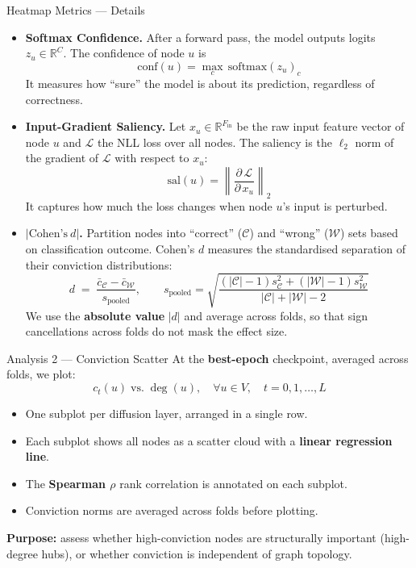 \documentclass[11pt]{beamer}
\begin{document}
\begin{frame}{Heatmap Metrics --- Details}
\begin{itemize}
    \setlength\itemsep{0.9em}

    \item \textbf{Softmax Confidence.}
    After a forward pass, the model outputs logits $z_u \in \mathbb{R}^C$. The confidence of node $u$ is
    \[
        \mathrm{conf}(u) = \max_{c}\, \mathrm{softmax}(z_u)_c
    \]
    It measures how ``sure'' the model is about its prediction, regardless of correctness.

    \item \textbf{Input-Gradient Saliency.}
    Let $x_u \in \mathbb{R}^{F_{\mathrm{in}}}$ be the raw input feature vector of node $u$ and $\mathcal{L}$ the NLL loss over all nodes. The saliency is the $\ell_2$ norm of the gradient of $\mathcal{L}$ with respect to $x_u$:
    \[
        \mathrm{sal}(u) = \left\|\frac{\partial\, \mathcal{L}}{\partial\, x_u}\right\|_2
    \]
    It captures how much the loss changes when node $u$'s input is perturbed.

    \item \textbf{$|\text{Cohen's}\ d|$.}
    Partition nodes into ``correct'' ($\mathcal{C}$) and ``wrong'' ($\mathcal{W}$) sets based on classification outcome. Cohen's $d$ measures the standardised separation of their conviction distributions:
    \[
        d \;=\; \frac{\bar{c}_{\mathcal{C}} - \bar{c}_{\mathcal{W}}}{s_{\mathrm{pooled}}}, \qquad
        s_{\mathrm{pooled}} = \sqrt{\frac{(|\mathcal{C}|-1)s_{\mathcal{C}}^2 + (|\mathcal{W}|-1)s_{\mathcal{W}}^2}{|\mathcal{C}|+|\mathcal{W}|-2}}
    \]
    We use the \textbf{absolute value} $|d|$ and average across folds, so that sign cancellations across folds do not mask the effect size.
\end{itemize}
\end{frame}


\begin{frame}{Analysis 2 --- Conviction Scatter}
At the \textbf{best-epoch} checkpoint, averaged across folds, we plot:
\[
    c_t(u) \;\text{vs.}\; \deg(u), \quad \forall u \in V, \quad t = 0, 1, \dots, L
\]
\bigskip
\begin{itemize}
    \setlength\itemsep{0.9em}
    \item One subplot per diffusion layer, arranged in a single row.
    \item Each subplot shows all nodes as a scatter cloud with a \textbf{linear regression line}.
    \item The \textbf{Spearman $\rho$} rank correlation is annotated on each subplot.
    \item Conviction norms are averaged across folds before plotting.
\end{itemize}
\bigskip
\textbf{Purpose:} assess whether high-conviction nodes are structurally important (high-degree hubs), or whether conviction is independent of graph topology.
\end{frame}
\end{document}
